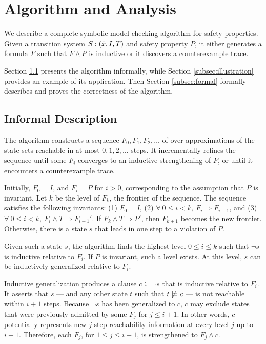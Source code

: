 \documentclass{llncs}
\newcommand{\band}{\wedge}
\newcommand{\bnot}{\neg}
\newcommand{\Bimplies}{\Rightarrow}
\begin{document}
\section{Algorithm and Analysis}
\label{sec:main}

We describe a complete symbolic model checking algorithm for safety
properties.  Given a transition system $S: (\vx, I, T)$ and safety
property $P$, it either generates a formula $F$ such that $F \band P$
is inductive or it discovers a counterexample trace.

Section \ref{subsec:informal} presents the algorithm informally, while
Section \ref{subsec:illustration} provides an example of its
application.  Then Section \ref{subsec:formal} formally describes and
proves the correctness of the algorithm.

\subsection{Informal Description}
\label{subsec:informal}

The algorithm constructs a sequence $F_{0}, F_{1}, F_{2}, \ldots$ of
over-approximations of the state sets reachable in at most $0, 1, 2,
\ldots$ steps.  It incrementally refines the sequence until some $F_i$
converges to an inductive strengthening of $P$, or until it encounters
a counterexample trace.

Initially, $F_0 = I$, and $F_i = P$ for $i > 0$, corresponding to the
assumption that $P$ is invariant.  Let $k$ be the level of $F_k$, the
frontier of the sequence.  The sequence satisfies the following
invariants: (1) $F_{0} = I$, (2) $\forall\ 0 \le i < k,\ F_{i}
\Bimplies F_{i+1}$, and (3) $\forall\ 0 \le i < k,\ F_{i} \band T
\Bimplies F_{i+1}'$.  If $F_k \band T \Bimplies P'$, then $F_{k+1}$
becomes the new frontier.  Otherwise, there is a state $s$ that leads
in one step to a violation of $P$.

Given such a state $s$, the algorithm finds the highest level $0 \le i
\le k$ such that $\bnot s$ is inductive relative to $F_{i}$.  If $P$
is invariant, such a level exists.  At this level, $s$ can be
inductively generalized relative to $F_{i}$.

Inductive generalization produces a clause $c \subseteq \bnot s$ that
is inductive relative to $F_{i}$.  It asserts that $s$ --- and any
other state $t$ such that $\notmodels{c}{t}$ --- is not reachable
within $i+1$ steps.  Because $\bnot s$ has been generalized to $c$,
$c$ may exclude states that were previously admitted by some $F_j$ for
$j \le i+1$.  In other words, $c$ potentially represents new $j$-step
reachability information at every level $j$ up to $i+1$.  Therefore,
each $F_j$, for $1 \le j \le i+1$, is strengthened to $F_j \band c$.
\end{document}

